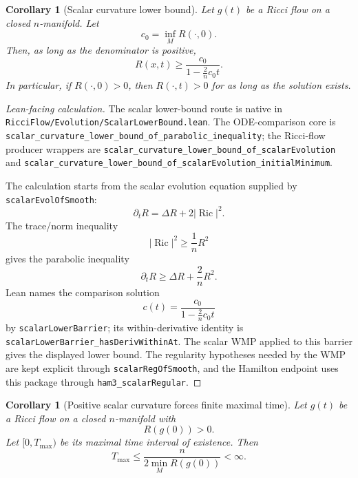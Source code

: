 \documentclass[11pt]{article}
\theoremstyle{plain}
\newtheorem{corollary}[theorem]{Corollary}
\theoremstyle{definition}
\theoremstyle{remark}
\newcommand{\Ric}{\operatorname{Ric}}
\newcommand{\norm}[1]{\left|#1\right|}
\newcommand{\leanref}[1]{\nolinkurl{#1}}
\newcommand{\leanfile}[1]{\nolinkurl{#1}}
\newcommand{\rffile}[1]{\leanfile{#1}}
\begin{document}
\begin{corollary}[Scalar curvature lower bound]
\label{cor:scalar-lower-bound}
Let $g(t)$ be a Ricci flow on a closed $n$-manifold. Let
\[
c_0=\inf_MR(\cdot,0).
\]
Then, as long as the denominator is positive,
\[
R(x,t)
\ge
\frac{c_0}{1-\frac2n c_0t}.
\]
In particular, if $R(\cdot,0)>0$, then $R(\cdot,t)>0$ for as long as the
solution exists.
\end{corollary}

\begin{proof}[Lean-facing calculation]
The scalar lower-bound route is native in
\rffile{RicciFlow/Evolution/ScalarLowerBound.lean}.  The ODE-comparison core is
\leanref{scalar_curvature_lower_bound_of_parabolic_inequality}; the Ricci-flow
producer wrappers are
\leanref{scalar_curvature_lower_bound_of_scalarEvolution} and
\leanref{scalar_curvature_lower_bound_of_scalarEvolution_initialMinimum}.

The calculation starts from the scalar evolution equation supplied by
\leanref{scalarEvolOfSmooth}:
\[
  \partial_tR=\Delta R+2\norm{\Ric}^2.
\]
The trace/norm inequality
\[
  \norm{\Ric}^2\ge \frac1n R^2
\]
gives the parabolic inequality
\[
  \partial_tR
  \ge
  \Delta R+\frac2nR^2.
\]
Lean names the comparison solution
\[
  c(t)=\frac{c_0}{1-\frac2n c_0t}
\]
by \leanref{scalarLowerBarrier}; its within-derivative identity is
\leanref{scalarLowerBarrier_hasDerivWithinAt}.  The scalar WMP applied to this
barrier gives the displayed lower bound.  The regularity hypotheses needed by
the WMP are kept explicit through \leanref{scalarRegOfSmooth}, and the Hamilton
endpoint uses this package through \leanref{ham3_scalarRegular}.
\end{proof}

\begin{corollary}[Positive scalar curvature forces finite maximal time]
\label{cor:positive-scalar-finite-time}
Let $g(t)$ be a Ricci flow on a closed $n$-manifold with
\[
R(g(0))>0.
\]
Let $[0,T_{\max})$ be its maximal time interval of existence. Then
\[
T_{\max}
\le
\frac{n}{2\min_M R(g(0))}
<\infty .
\]
\end{corollary}
\end{document}
